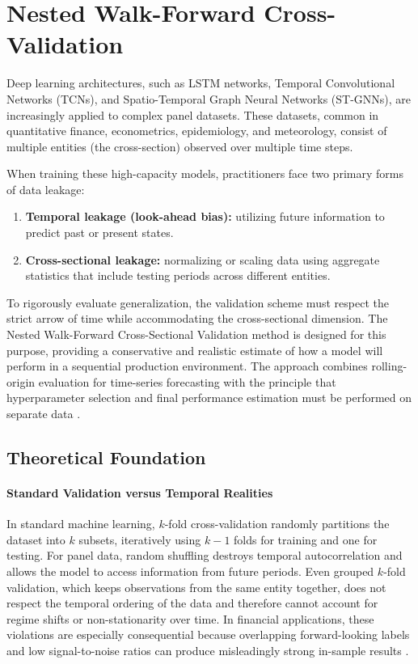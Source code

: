 \section{Nested Walk-Forward Cross-Validation}
\label{app:nwfcv}

Deep learning architectures, such as \acf{LSTM} networks, Temporal Convolutional Networks (TCNs), and Spatio-Temporal Graph Neural Networks (ST-GNNs), are increasingly applied to complex panel datasets. These datasets, common in quantitative finance, econometrics, epidemiology, and meteorology, consist of multiple entities (the cross-section) observed over multiple time steps.

\medskip

When training these high-capacity models, practitioners face two primary forms of data leakage:
\begin{enumerate}
	\item \textbf{Temporal leakage (look-ahead bias):} utilizing future information to predict past or present states.
	\item \textbf{Cross-sectional leakage:} normalizing or scaling data using aggregate statistics that include testing periods across different entities.
\end{enumerate}

To rigorously evaluate generalization, the validation scheme must respect the strict arrow of time while accommodating the cross-sectional dimension. The Nested Walk-Forward Cross-Sectional Validation method is designed for this purpose, providing a conservative and realistic estimate of how a model will perform in a sequential production environment. The approach combines rolling-origin evaluation for time-series forecasting \citep{hyndman2021forecasting} with the principle that hyperparameter selection and final performance estimation must be performed on separate data \citep{cawley2010overfitting}.

\subsection{Theoretical Foundation}

\paragraph{Standard Validation versus Temporal Realities}
In standard machine learning, $k$-fold cross-validation randomly partitions the dataset into $k$ subsets, iteratively using $k-1$ folds for training and one for testing. For panel data, random shuffling destroys temporal autocorrelation and allows the model to access information from future periods. Even grouped $k$-fold validation, which keeps observations from the same entity together, does not respect the temporal ordering of the data and therefore cannot account for regime shifts or non-stationarity over time. In financial applications, these violations are especially consequential because overlapping forward-looking labels and low signal-to-noise ratios can produce misleadingly strong in-sample results \citep{lopezdeprado2018advances}.

